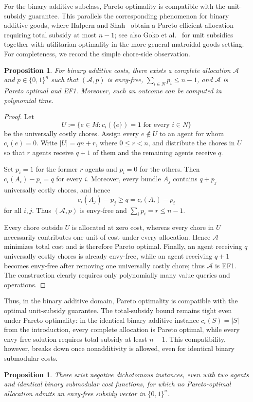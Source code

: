 \documentclass[sigconf,anonymous]{aamas}
\theoremstyle{acmplain}
\newtheorem{proposition}[theorem]{Proposition}
\theoremstyle{acmdefinition}
\theoremstyle{acmplain}
\begin{document}
For the binary additive subclass, Pareto optimality is compatible with the unit-subsidy guarantee. This parallels the corresponding phenomenon for binary additive goods, where Halpern and Shah~\cite{HS19} obtain a Pareto-efficient allocation requiring total subsidy at most $n-1$; see also Goko et al.~\cite{goko2024fair} for unit subsidies together with utilitarian optimality in the more general matroidal goods setting. For completeness, we record the simple chore-side observation.

\begin{proposition}
\label{prop:additive-po}
For binary additive costs, there exists a complete allocation $\mathcal A$ and $p\in\{0,1\}^n$ such that $(\mathcal A,p)$ is envy-free, $\sum_{i\in N}p_i\le n-1$, and $\mathcal A$ is Pareto optimal and EF1. Moreover, such an outcome can be computed in polynomial time.
\end{proposition}

\begin{proof}
Let
\[
U:=\{e\in M:c_i(\{e\})=1\text{ for every }i\in N\}
\]
be the universally costly chores. Assign every $e\notin U$ to an agent for whom $c_i(e)=0$. Write $|U|=qn+r$, where $0\le r<n$, and distribute the chores in $U$ so that $r$ agents receive $q+1$ of them and the remaining agents receive $q$.

Set $p_i=1$ for the former $r$ agents and $p_i=0$ for the others. Then $c_i(A_i)-p_i=q$ for every $i$. Moreover, every bundle $A_j$ contains $q+p_j$ universally costly chores, and hence
\[
c_i(A_j)-p_j\ge q=c_i(A_i)-p_i
\]
for all $i,j$. Thus $(\mathcal A,p)$ is envy-free and $\sum_i p_i=r\le n-1$.

Every chore outside $U$ is allocated at zero cost, whereas every chore in $U$ necessarily contributes one unit of cost under every allocation. Hence $\mathcal A$ minimizes total cost and is therefore Pareto optimal. Finally, an agent receiving $q$ universally costly chores is already envy-free, while an agent receiving $q+1$ becomes envy-free after
removing one universally costly chore; thus $\mathcal A$ is EF1. The construction clearly requires only polynomially many value queries
and operations.
\end{proof}

Thus, in the binary additive domain, Pareto optimality is compatible with the optimal unit-subsidy guarantee. The total-subsidy bound remains tight even under Pareto optimality: in the identical binary additive instance $c_i(S)=|S|$ from the introduction, every complete allocation is Pareto optimal, while every envy-free solution requires total subsidy at least $n-1$. This compatibility, however, breaks down once nonadditivity is allowed, even for identical binary submodular costs.
\begin{proposition}
\label{prop:po-impossibility}
There exist negative dichotomous instances, even with two agents and identical binary submodular cost functions, for which no Pareto-optimal allocation admits an envy-free subsidy vector in $\{0,1\}^n$.
\end{proposition}
\end{document}
